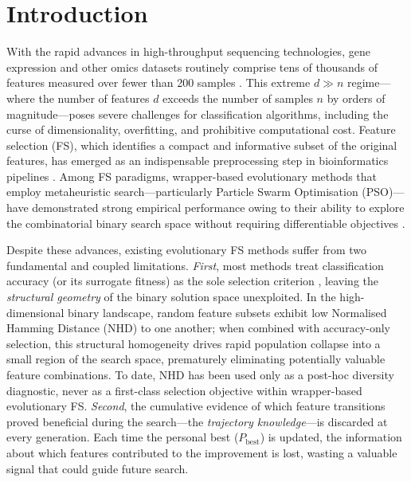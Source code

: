 \documentclass[a4paper,fleqn]{cas-dc}
\begin{document}
\begin{sloppypar}

	\section{Introduction}
	\label{sec:intro}

	\par{
	With the rapid advances in high-throughput sequencing technologies,
	gene expression and other omics datasets routinely comprise tens of
	thousands of features measured over fewer than 200 samples
	\citep{bolnick2014precision,hampton2004introduction}.
	This extreme $d \gg n$ regime---where the number of features $d$
	exceeds the number of samples $n$ by orders of magnitude---poses
	severe challenges for classification algorithms, including the curse
	of dimensionality, overfitting, and prohibitive computational cost.
	Feature selection (FS), which identifies a compact and informative
	subset of the original features, has emerged as an indispensable
	preprocessing step in bioinformatics pipelines
	\citep{saeys2007review,dash1997feature}.
	Among FS paradigms, wrapper-based evolutionary methods that employ
	metaheuristic search---particularly Particle Swarm Optimisation
	(PSO)---have demonstrated strong empirical performance owing to
	their ability to explore the combinatorial binary search space
	without requiring differentiable objectives
	\citep{xue2015survey,wang2021particle}.
	}

	\par{
	Despite these advances, existing evolutionary FS methods suffer from
	two fundamental and coupled limitations.
	\textit{First}, most methods treat classification accuracy (or its
	surrogate fitness) as the sole selection criterion
	\citep{chuang2011binary,zhang2015adaptive,huang2020enhanced},
	leaving the \emph{structural geometry} of the binary solution space
	unexploited.
	In the high-dimensional binary landscape, random feature subsets
	exhibit low Normalised Hamming Distance (NHD) to one another;
	when combined with accuracy-only selection, this structural
	homogeneity drives rapid population collapse into a small region
	of the search space, prematurely eliminating potentially valuable
	feature combinations.
	To date, NHD has been used only as a post-hoc diversity diagnostic,
	never as a first-class selection objective within wrapper-based
	evolutionary FS.
	\textit{Second}, the cumulative evidence of which feature transitions
	proved beneficial during the search---the \emph{trajectory knowledge}---is
	discarded at every generation.
	Each time the personal best ($P_{\mathrm{best}}$) is updated,
	the information about which features contributed to the improvement
	is lost, wasting a valuable signal that could guide future search.
	}


\end{sloppypar}
\end{document}
